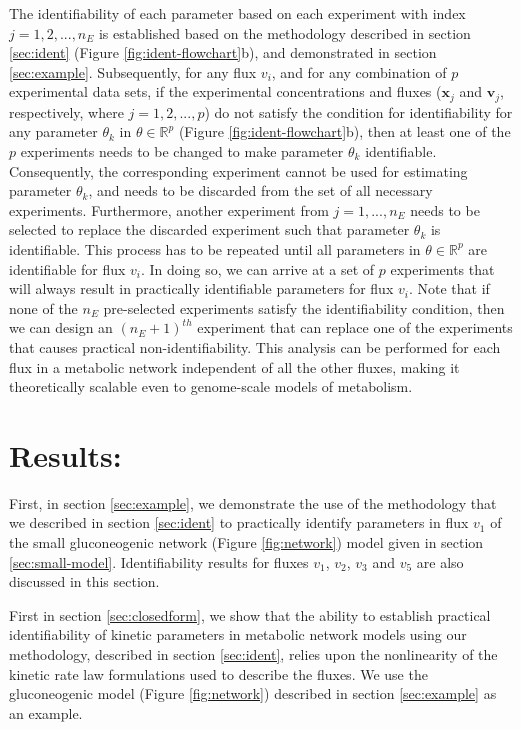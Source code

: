 \documentclass[10pt]{article}
\begin{document}
	The identifiability of each parameter based on each experiment with index $j = {1, 2, ..., n_E}$ is established based on the methodology described in section \ref{sec:ident} (Figure \ref{fig:ident-flowchart}b), and demonstrated in section \ref{sec:example}. Subsequently, for any flux $v_i$, and for any combination of $p$ experimental data sets, if the experimental concentrations and fluxes ($\mathbf{x}_j$ and $\mathbf{v}_j$, respectively, where $j = {1, 2,..., p}$) do not satisfy the condition for identifiability for any parameter $\theta_k$ in $\theta\in\mathbb{R}^p$ (Figure \ref{fig:ident-flowchart}b), then at least one of the $p$ experiments needs to be changed to make parameter $\theta_k$ identifiable. Consequently, the corresponding experiment cannot be used for estimating parameter $\theta_k$, and needs to be discarded from the set of all necessary experiments. Furthermore, another experiment from $j = {1, ..., n_E}$ needs to be selected to replace the discarded experiment such that parameter $\theta_k$ is identifiable. This process has to be repeated until all parameters in $\theta\in\mathbb{R}^p$ are identifiable for flux $v_i$. In doing so, we can arrive at a set of $p$ experiments that will always result in practically identifiable parameters for flux $v_i$. Note that if none of the $n_E$ pre-selected experiments satisfy the identifiability condition, then we can design an $(n_E+1)^{th}$ experiment that can replace one of the experiments that causes practical non-identifiability. This analysis can be performed for each flux in a metabolic network independent of all the other fluxes, making it theoretically scalable even to genome-scale models of metabolism. 	
	
	\section{Results:}
	First, in section \ref{sec:example}, we demonstrate the use of the methodology that we described in section \ref{sec:ident} to practically identify parameters in flux $v_1$ of the small gluconeogenic network (Figure \ref{fig:network}) model given in section \ref{sec:small-model}. Identifiability results for fluxes $v_1$, $v_2$, $v_3$ and $v_5$ are also discussed in this section. 
	
	First in section \ref{sec:closedform}, we show that the ability to establish practical identifiability of kinetic parameters in metabolic network models using our methodology, described in section \ref{sec:ident}, relies upon the nonlinearity of the kinetic rate law formulations used to describe the fluxes. We use the gluconeogenic model (Figure \ref{fig:network}) described in section \ref{sec:example} as an example. 
	
\end{document}
